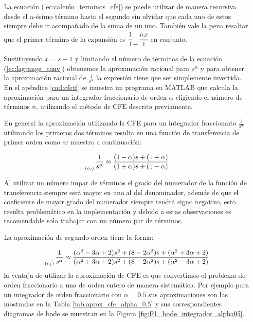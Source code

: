	La ecuación (\ref{ec:calculo_terminos_cfe}) se puede utilizar de manera recursiva desde el $n$-ésimo término hasta el segundo sin olvidar que cada uno de estos siempre debe ir acompañado de la suma de un uno. También vale la pena resaltar que el primer término de la expansión es $\cfrac{1}{1} \genfrac{}{}{0pt}{0}{}{-} \cfrac{\alpha x}{1}$ en conjunto. 

	Sustituyendo $x = s - 1$ y limitando el número de términos de la ecuación (\ref{ec:lagrange_conv}) obtenemos la aproximación racional para $s^{\alpha}$ y para obtener la aproximación racional de $\frac{1}{s^{\alpha}}$ la expresión tiene que ser simplemente invertida. En el apéndice \ref{cod:cfetf} se muestra un programa en MATLAB que calcula la aproximación para un integrador fraccionario de orden $\alpha$ eligiendo el número de términos $n$, utilizando el método de CFE descrito previamente.

	En general la aproximación utilizando la CFE para un integrador fraccionario $\frac{1}{s^{\alpha}}$ utilizando los primeros dos términos resulta en una función de transferencia de primer orden como se muestra a continuación:

	\begin{equation}
		\genfrac{}{}{0pt}{0}{}{_{(c_{2})}} \frac{1}{s^{\alpha}} \approx \frac{(1 - \alpha)s + (1 + \alpha) }{(1 + \alpha)s + (1 - \alpha)} 
	\end{equation}

	Al utilizar un número impar de términos el grado del numerador de la función de transferencia siempre será mayor en uno al del denominador, además de que el coeficiente de mayor grado del numerador siempre tendrá signo negativo, esto resulta problemático en la implementación y debido a estas observaciones es recomendable solo trabajar con un número par de términos.

	La aproximación de segundo orden tiene la forma:

	\begin{equation}
		\genfrac{}{}{0pt}{0}{}{_{(c_{4})}} \frac{1}{s^{\alpha}} \approx \frac{(\alpha^{2} - 3\alpha + 2) s^{2} + (8 - 2 \alpha^{2})s + (\alpha^{2} + 3\alpha + 2) }{(\alpha^{2} + 3\alpha + 2) s^{2} + (8 - 2 \alpha^{2})s + (\alpha^{2} - 3\alpha + 2)}
	\end{equation}
la ventaja de utilizar la aproximación de CFE es que convertimos el problema de orden fraccionario a uno de orden entero de manera sistemática. Por ejemplo para un integrador de orden fraccionario con $\alpha = 0.5$ sus aproximaciones son las mostradas en la Tabla \ref{tab:aprox_cfe_alpha_0.5} y sus correspondientes diagramas de bode se muestran en la Figura \ref{fig:F1_bode_integrador_alpha05}.


